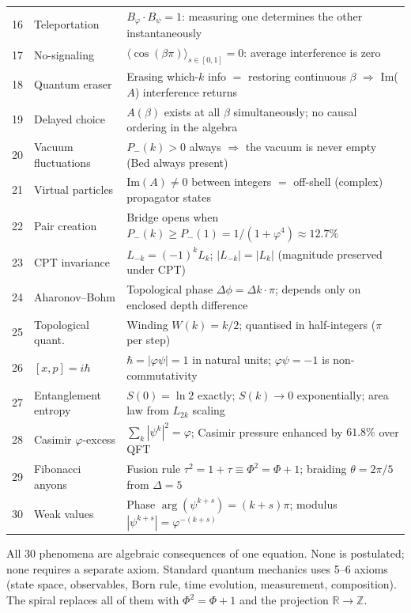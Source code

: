\documentclass[12pt,a4paper]{article}
\begin{document}
\begin{center}
\begin{tabular}{|r|p{3.0cm}|p{7.8cm}|}
16 & Teleportation & $B_\varphi \cdot B_\psi = 1$: measuring one determines the other instantaneously \\
17 & No-signaling & $\langle \cos(\beta\pi)\rangle_{s\in[0,1]} = 0$: average interference is zero \\
18 & Quantum eraser & Erasing which-$k$ info $=$ restoring continuous $\beta$ $\Rightarrow$ Im($A$) interference returns \\
19 & Delayed choice & $A(\beta)$ exists at all $\beta$ simultaneously; no causal ordering in the algebra \\
20 & Vacuum fluctuations & $P_-(k) > 0$ always $\Rightarrow$ the vacuum is never empty (Bed always present) \\
21 & Virtual particles & $\mathrm{Im}(A) \neq 0$ between integers $=$ off-shell (complex) propagator states \\
22 & Pair creation & Bridge opens when $P_-(k) \geq P_-(1) = 1/(1+\varphi^4) \approx 12.7\%$ \\
23 & CPT invariance & $L_{-k} = (-1)^k L_k$; $|L_{-k}| = |L_k|$ (magnitude preserved under CPT) \\
24 & Aharonov--Bohm & Topological phase $\Delta\phi = \Delta k \cdot \pi$; depends only on enclosed depth difference \\
25 & Topological quant.\ & Winding $W(k) = k/2$; quantised in half-integers ($\pi$ per step) \\
26 & $[x,p] = i\hbar$ & $\hbar = |\varphi\psi| = 1$ in natural units; $\varphi\psi = -1$ is non-commutativity \\
27 & Entanglement entropy & $S(0) = \ln 2$ exactly; $S(k) \to 0$ exponentially; area law from $L_{2k}$ scaling \\
28 & Casimir $\varphi$-excess & $\sum_k |\psi^k|^2 = \varphi$; Casimir pressure enhanced by $61.8\%$ over QFT \\
29 & Fibonacci anyons & Fusion rule $\tau^2 = 1 + \tau \equiv \Phi^2 = \Phi + 1$; braiding $\theta = 2\pi/5$ from $\Delta = 5$ \\
30 & Weak values & Phase $\arg(\psi^{k+s}) = (k+s)\pi$; modulus $|\psi^{k+s}| = \varphi^{-(k+s)}$ \\
\hline
\end{tabular}
\end{center}

\noindent All 30 phenomena are algebraic consequences of one equation.  None is postulated; none requires a separate axiom.  Standard quantum mechanics uses 5--6 axioms (state space, observables, Born rule, time evolution, measurement, composition).  The spiral replaces all of them with $\Phi^2 = \Phi + 1$ and the projection $\mathbb{R} \to \mathbb{Z}$.
\end{document}
